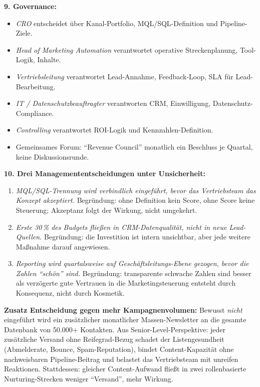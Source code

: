\documentclass[11pt,a4paper,oneside]{article}
\begin{document}
\begin{loesungbox}
\smallskip
\textbf{9. Governance:}
\begin{itemize}
  \item \emph{CRO} entscheidet über Kanal-Portfolio, MQL/SQL-Definition und Pipeline-Ziele.
  \item \emph{Head of Marketing Automation} verantwortet operative Streckenplanung, Tool-Logik, Inhalte.
  \item \emph{Vertriebsleitung} verantwortet Lead-Annahme, Feedback-Loop, SLA für Lead-Bearbeitung.
  \item \emph{IT / Datenschutzbeauftragter} verantworten CRM, Einwilligung, Datenschutz-Compliance.
  \item \emph{Controlling} verantwortet ROI-Logik und Kennzahlen-Definition.
  \item Gemeinsames Forum: ``Revenue Council'' monatlich \textendash{} ein Beschluss je Quartal, keine Diskussionsrunde.
\end{itemize}

\smallskip
\textbf{10. Drei Managemententscheidungen unter Unsicherheit:}
\begin{enumerate}
  \item \emph{MQL/SQL-Trennung wird verbindlich eingeführt, bevor das Vertriebsteam das Konzept akzeptiert.} Begründung: ohne Definition kein Score, ohne Score keine Steuerung; Akzeptanz folgt der Wirkung, nicht umgekehrt.
  \item \emph{Erste 30\,\% des Budgets fließen in CRM-Datenqualität, nicht in neue Lead-Quellen.} Begründung: die Investition ist intern unsichtbar, aber jede weitere Maßnahme darauf angewiesen.
  \item \emph{Reporting wird quartalsweise auf Geschäftsleitungs-Ebene gezogen, bevor die Zahlen ``schön'' sind.} Begründung: transparente schwache Zahlen sind besser als verzögerte gute \textendash{} Vertrauen in die Marketingsteuerung entsteht durch Konsequenz, nicht durch Kosmetik.
\end{enumerate}

\smallskip
\textbf{Zusatz \textendash{} Entscheidung gegen mehr Kampagnenvolumen:}
Bewusst \emph{nicht} eingeführt wird ein zusätzlicher monatlicher Massen-Newsletter an die gesamte Datenbank von 50.000+ Kontakten. Aus Senior-Level-Perspektive: jeder zusätzliche Versand ohne Reifegrad-Bezug schadet der Listengesundheit (Abmelderate, Bounce, Spam-Reputation), bindet Content-Kapazität ohne nachweisbaren Pipeline-Beitrag und belastet das Vertriebsteam mit unreifen Reaktionen. Stattdessen: gleicher Content-Aufwand fließt in zwei rollenbasierte Nurturing-Strecken \textendash{} weniger ``Versand'', mehr Wirkung.
\end{loesungbox}
\end{document}
